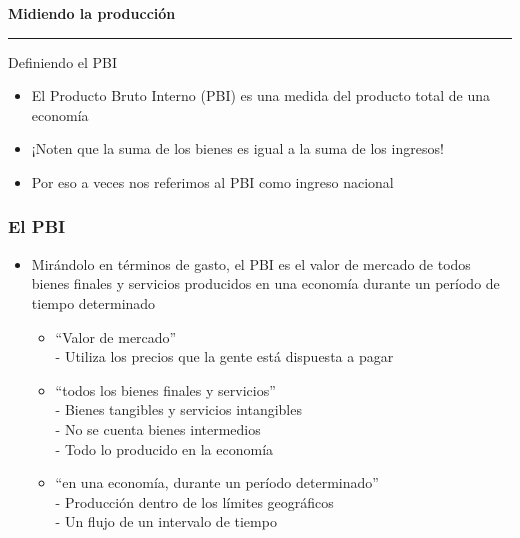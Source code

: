 \documentclass{beamer}
\begin{document}
\begin{frame}{}
\centering\huge\textbf{Midiendo la producción} 
\vspace{2mm}
\hrule
\end{frame}

\begin{frame}{Definiendo el PBI}
\begin{itemize}
   \item El Producto Bruto Interno (PBI) es una medida del producto total de una economía \vspace{1mm}
   \item ¡Noten que la suma de los bienes es igual a la suma de los ingresos! \vspace{1mm}
   \item Por eso a veces nos referimos al PBI como ingreso nacional
   \end{itemize}
\end{frame}

\begin{frame}
\frametitle{El PBI}
\begin{itemize}
        \item Mirándolo en términos de gasto, el PBI es el valor de mercado de todos bienes finales y servicios producidos en una economía durante un período de tiempo determinado \vspace{1mm}
        \begin{itemize}
            \item ``Valor de mercado'' \\ 
            - Utiliza los precios que la gente está dispuesta a pagar \vspace{1mm}
            \item ``todos los bienes finales y servicios'' \\
            - Bienes tangibles y servicios intangibles \\
            - No se cuenta bienes intermedios \\
            - Todo lo producido en la economía\\ \vspace{1mm}
            \item ``en una economía, durante un período determinado'' \\
            - Producción dentro de los límites geográficos \\
            - Un flujo de un intervalo de tiempo \\ 
        \end{itemize}
\end{itemize}
\end{frame}
\end{document}
